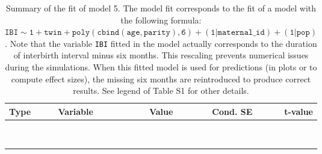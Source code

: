 \begin{table}[H]

\caption{\label{tab:tab5}Summary of the fit of model 5. The model fit corresponds to the fit of a model with the following formula: {\small$\mathtt{IBI \sim 1 + twin + poly(cbind(age, parity), 6) + (1 | maternal\_id) + (1 | pop)}$}. Note that the variable \texttt{IBI} fitted in the model actually corresponds to the duration of interbirth interval minus six months. This rescaling prevents numerical issues during the simulations. When this fitted model is used for predictions (in plots or to compute effect sizes), the missing six months are reintroduced to produce correct results. See legend of Table S1 for other details.}
\centering
\fontsize{8}{10}\selectfont
\begin{tabular}[t]{>{\raggedright\arraybackslash}p{3cm}>{\raggedright\arraybackslash}p{5cm}rrr}
\toprule
Type & Variable & Value & Cond. SE & t-value\\
\midrule
\cellcolor{gray!6}{fixed effects} & \cellcolor{gray!6}{$\beta_1$} & \cellcolor{gray!6}{3.44} & \cellcolor{gray!6}{0.0579} & \cellcolor{gray!6}{59.5}\\
\cellcolor{gray!6}{} & \cellcolor{gray!6}{$\beta_{\mathtt{twin}}$} & \cellcolor{gray!6}{-0.0328} & \cellcolor{gray!6}{0.015} & \cellcolor{gray!6}{-2.18}\\
\cellcolor{gray!6}{} & \cellcolor{gray!6}{$\beta_{\mathtt{age}}$} & \cellcolor{gray!6}{-63.6} & \cellcolor{gray!6}{21.9} & \cellcolor{gray!6}{-2.9}\\
\cellcolor{gray!6}{} & \cellcolor{gray!6}{$\beta_{\mathtt{age}^2}$} & \cellcolor{gray!6}{39.7} & \cellcolor{gray!6}{19.6} & \cellcolor{gray!6}{2.02}\\
\cellcolor{gray!6}{} & \cellcolor{gray!6}{$\beta_{\mathtt{age}^3}$} & \cellcolor{gray!6}{-31.3} & \cellcolor{gray!6}{13} & \cellcolor{gray!6}{-2.41}\\
\cellcolor{gray!6}{} & \cellcolor{gray!6}{$\beta_{\mathtt{age}^4}$} & \cellcolor{gray!6}{15} & \cellcolor{gray!6}{6.31} & \cellcolor{gray!6}{2.38}\\
\cellcolor{gray!6}{} & \cellcolor{gray!6}{$\beta_{\mathtt{age}^5}$} & \cellcolor{gray!6}{-5} & \cellcolor{gray!6}{2.42} & \cellcolor{gray!6}{-2.07}\\
\cellcolor{gray!6}{} & \cellcolor{gray!6}{$\beta_{\mathtt{age}^6}$} & \cellcolor{gray!6}{4.01} & \cellcolor{gray!6}{1.01} & \cellcolor{gray!6}{3.95}\\
\cellcolor{gray!6}{} & \cellcolor{gray!6}{$\beta_{\mathtt{parity}}$} & \cellcolor{gray!6}{121} & \cellcolor{gray!6}{40.7} & \cellcolor{gray!6}{2.96}\\

\end{tabular}
\end{table}
